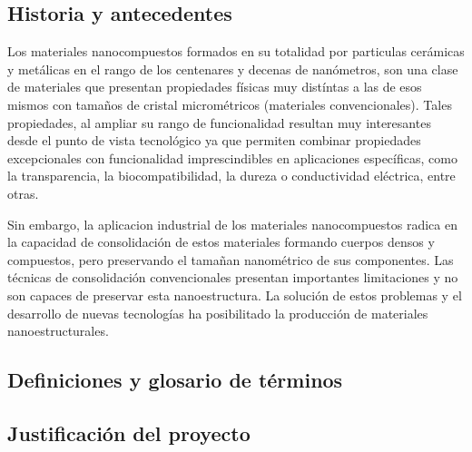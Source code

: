 
  \subsection{Historia y antecedentes}  

Los materiales nanocompuestos formados en su totalidad por particulas cerámicas y metálicas en el rango de los centenares
  y decenas de nanómetros, son una clase de materiales que presentan propiedades físicas muy distíntas a las de esos mismos
 con tamaños de cristal micrométricos (materiales convencionales). Tales propiedades, al ampliar su rango de funcionalidad
 resultan muy interesantes desde el punto de vista tecnológico ya que permiten combinar propiedades excepcionales con funcionalidad
 imprescindibles en aplicaciones específicas, como la transparencia, la biocompatibilidad, la dureza o conductividad eléctrica, entre otras.

 Sin embargo, la aplicacion industrial de los materiales nanocompuestos radica en la capacidad de consolidación de estos materiales
 formando cuerpos densos y compuestos, pero preservando el tamañan nanométrico de sus componentes. Las técnicas de consolidación convencionales
 presentan importantes limitaciones y no son capaces de preservar esta nanoestructura. 
 La solución de estos problemas y el desarrollo de nuevas tecnologías ha posibilitado la producción de materiales nanoestructurales.

  \newpage


  \subsection{Definiciones y glosario de términos}  

  \newpage



  \subsection{Justificación del proyecto}  

  \newpage


